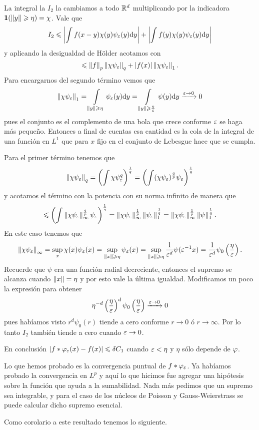 \documentclass[12pt]{memoir}
\begin{document}
\begin{ptcb}
  La integral la $I_2$ la cambiamos a todo $\mathbb{R}^d$ multiplicando por la indicadora $\mathbf{1}(\left\|y\right\|\geqslant\eta)=\chi$. Vale que
  $$I_2\leqslant\abs{\int f(x-y)\chi(y)\psi_\varepsilon(y)\dd y}+\abs{\int f(y)\chi(y)\psi_\varepsilon(y)\dd y}$$
  y aplicando la desigualdad de Hölder acotamos con 
  $$\leqslant \left\|f\right\|_p\left\|\chi\psi_\varepsilon\right\|_q+|f(x)|\left\|\chi\psi_\varepsilon\right\|_1.$$
  Para encargarnos del segundo término vemos que
  $$\left\|\chi\psi_\varepsilon\right\|_1=\int\limits_{\left\|y\right\|\geqslant\eta}\psi_\varepsilon(y)\dd y=\int\limits_{\left\|y\right\|\geqslant\frac\eta{\varepsilon}}\psi(y)\dd y\xrightarrow[]{\varepsilon\to 0}0$$
  pues el conjunto es el complemento de una bola que crece conforme $\varepsilon$ se haga más pequeño. Entonces a final de cuentas esa cantidad es la cola de la integral de una función en $L^1$ que para $x$ fijo en el conjunto de Lebesgue hace que se cumpla.\par 
  Para el primer término tenemos que 
  $$\left\|\chi\psi_\varepsilon\right\|_q=\left(\int\chi\psi_\varepsilon^q\right)^{\frac{1}{q}}=\left(\int(\chi\psi_\varepsilon)^\frac{q}{p}\psi_\varepsilon\right)^{\frac{1}{q}}$$
  y acotamos el término con la potencia con su norma infinito de manera que 
  $$\leqslant\left(\int\left\|\chi\psi_\varepsilon\right\|_{\infty}^\frac{q}{p}\psi_\varepsilon\right)^{\frac{1}{q}}=\left\|\chi\psi_\varepsilon\right\|_\infty^{\frac{1}{p}}\left\|\psi_\varepsilon\right\|^\frac{1}{q}_1=\left\|\chi\psi_\varepsilon\right\|_\infty^{\frac{1}{p}}\left\|\psi\right\|^\frac{1}{q}_1.$$
  En este caso tenemos que 
  $$\left\|\chi\psi_\varepsilon\right\|_\infty=\sup_x\chi(x)\psi_\varepsilon(x)=\sup_{\left\|x\right\|\geqslant\eta}\psi_\varepsilon(x)=\sup_{\left\|x\right\|\geqslant\eta}\frac{1}{\varepsilon^d}\psi(\varepsilon^{-1}x)=\frac{1}{\varepsilon^d}\psi_0\left(\frac{\eta}{\varepsilon}\right).$$
  Recuerde que $\psi$ era una función radial decreciente, entonces el supremo se alcanza cuando $\left\|x\right\|=\eta$ y por esto vale la última igualdad. Modificamos un poco la expresión para obtener
  $$\eta^{-d}\left(\frac\eta{\varepsilon}\right)^d\psi_0\left(\frac\eta{\varepsilon}\right)\xrightarrow[]{\varepsilon\to0}0$$
  pues habíamos visto $r^d\psi_0(r)$ tiende a cero conforme $r\to 0$ ó $r\to\infty$. Por lo tanto $I_2$ también tiende a cero cuando $\varepsilon\to 0$.\par 
  En conclusión $|f\ast \varphi_\varepsilon(x)-f(x)|\leqslant \delta C_1$ cuando $\varepsilon<\eta$ y $\eta$ sólo depende de $\varphi$.
\end{ptcb}

Lo que hemos probado es la convergencia puntual de $f\ast\varphi_\varepsilon$. Ya habíamos probado la convergencia en $L^p$ y aquí lo que hicimos fue agregar una hipótesis sobre la función que ayuda a la sumabilidad. Nada más pedimos que un supremo sea integrable, y para el caso de los núcleos de Poisson y Gauss-Weierstrass se puede calcular dicho supremo esencial.\par 
Como corolario a este resultado tenemos lo siguiente.
\end{document}
